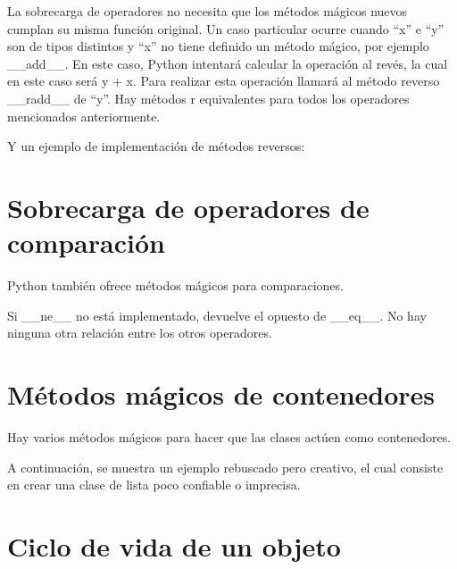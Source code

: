 \documentclass{report}
\newcommand{\doble}[1]{``#1''}
\begin{document}
{

La sobrecarga de operadores no necesita que los métodos mágicos nuevos cumplan su misma función original.
Un caso particular ocurre cuando \doble{x} e \doble{y} son de tipos distintos y \doble{x} no tiene definido un método mágico, por ejemplo \_\_add\_\_. En este caso, Python intentará calcular la operación al revés, la cual en este caso será y + x. Para realizar esta operación llamará al método reverso \_\_radd\_\_ de “y”.
Hay métodos r equivalentes para todos los operadores mencionados anteriormente.


Y un ejemplo de implementación de métodos reversos:


\section{Sobrecarga de operadores de comparación}

Python también ofrece métodos mágicos para comparaciones.


Si \_\_ne\_\_ no está implementado, devuelve el opuesto de \_\_eq\_\_. No hay ninguna otra relación entre los otros operadores.


\section{Métodos mágicos de contenedores}

Hay varios métodos mágicos para hacer que las clases actúen como contenedores.


A continuación, se muestra un ejemplo rebuscado pero creativo, el cual consiste en crear una clase de lista poco confiable o imprecisa.



\section{Ciclo de vida de un objeto}

}
\end{document}
